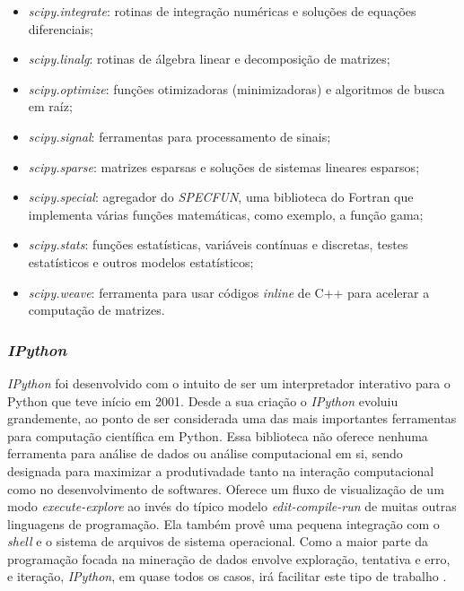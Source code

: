 \begin{itemize}
	\item \textit{scipy.integrate}: rotinas de integração numéricas e soluções de equações diferenciais;
	\item \textit{scipy.linalg}: rotinas de álgebra linear e decomposição de matrizes;
	\item \textit{scipy.optimize}: funções otimizadoras (minimizadoras) e algoritmos de busca em raíz;
	\item \textit{scipy.signal}: ferramentas para processamento de sinais;
	\item \textit{scipy.sparse}: matrizes esparsas e soluções de sistemas lineares esparsos;
	\item \textit{scipy.special}: agregador do \textit{SPECFUN}, uma biblioteca do Fortran que implementa várias funções matemáticas, como exemplo, a função gama;
	\item \textit{scipy.stats}: funções estatísticas, variáveis contínuas e discretas, testes estatísticos e outros modelos estatísticos;
	\item \textit{scipy.weave}: ferramenta para usar códigos \textit{inline} de C++ para acelerar a computação de matrizes.
\end{itemize}


\subsubsection{\textbf{\textit{IPython}}}
\textit{IPython} foi desenvolvido com o intuito de ser um interpretador interativo para o Python que teve início em 2001. Desde a sua criação o \textit{IPython} evoluiu grandemente, ao ponto de ser considerada uma das mais importantes ferramentas para computação científica em Python. Essa biblioteca não oferece nenhuma ferramenta para análise de dados ou análise computacional em si, sendo designada para maximizar a produtivadade tanto na interação computacional como no desenvolvimento de softwares. Oferece um fluxo de visualização de um modo \textit{execute-explore} ao invés do típico modelo \textit{edit-compile-run} de muitas outras linguagens de programação. Ela também provê uma pequena integração com o \textit{shell} e o sistema de arquivos de sistema operacional. Como a maior parte da programação focada na mineração de dados envolve exploração, tentativa e erro, e iteração, \textit{IPython}, em quase todos os casos, irá facilitar este tipo de trabalho \cite{python-analysis}.

